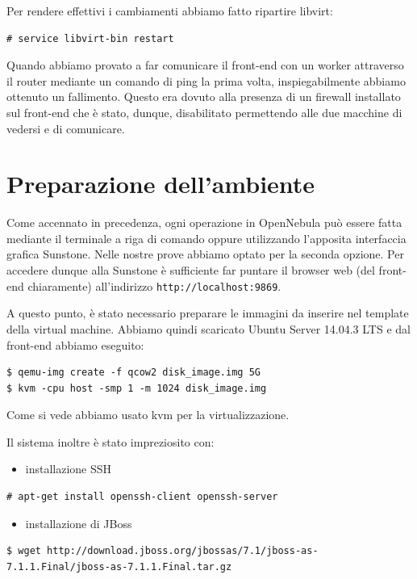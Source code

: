 \documentclass[twoside]{article}
\begin{document}
Per rendere effettivi i cambiamenti abbiamo fatto ripartire libvirt:
\begin{lstlisting}[frame=trBL]
# service libvirt-bin restart
\end{lstlisting}

Quando abbiamo provato a far comunicare il front-end con un worker attraverso il router
mediante un comando di ping la prima volta, inspiegabilmente abbiamo ottenuto un fallimento. Questo
era dovuto alla presenza di un firewall installato sul front-end che è stato, dunque, disabilitato
permettendo alle due macchine di vedersi e di comunicare.

\section{Preparazione dell'ambiente}
Come accennato in precedenza, ogni operazione in OpenNebula può essere fatta mediante
il terminale a riga di comando oppure utilizzando l'apposita interfaccia grafica Sunstone. Nelle nostre
prove abbiamo optato per la seconda opzione. Per accedere dunque alla Sunstone è sufficiente far puntare il
browser web (del front-end chiaramente) all'indirizzo \texttt{http://localhost:9869}.

A questo punto, è stato necessario preparare le immagini da inserire nel template della virtual machine.
Abbiamo quindi scaricato Ubuntu Server 14.04.3 LTS e dal front-end abbiamo eseguito:
\begin{lstlisting}[frame=trBL]
$ qemu-img create -f qcow2 disk_image.img 5G
$ kvm -cpu host -smp 1 -m 1024 disk_image.img
\end{lstlisting}
Come si vede abbiamo usato kvm \cite{bib:kvm} per la virtualizzazione.

Il sistema inoltre è stato impreziosito con:
\begin{itemize}
	\item installazione SSH
\end{itemize}
\begin{lstlisting}[frame=trBL]
# apt-get install openssh-client openssh-server
\end{lstlisting}
\begin{itemize}
\item installazione di JBoss
\end{itemize}		  
\begin{lstlisting}[frame=trBL]
$ wget http://download.jboss.org/jbossas/7.1/jboss-as-7.1.1.Final/jboss-as-7.1.1.Final.tar.gz		  
\end{lstlisting}
\end{document}
